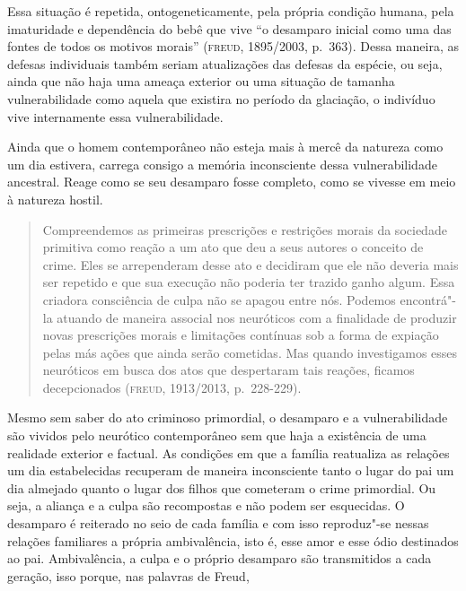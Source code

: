 Essa situação é repetida, ontogeneticamente, pela própria condição
humana, pela imaturidade e dependência do bebê que vive ``o desamparo
inicial como uma das fontes de todos os motivos morais'' (\textsc{freud},
1895/2003, p.~363). Dessa maneira, as defesas individuais também seriam
atualizações das defesas da espécie, ou seja, ainda que não haja uma
ameaça exterior ou uma situação de tamanha vulnerabilidade como aquela
que existira no período da glaciação, o indivíduo vive internamente essa
vulnerabilidade.

Ainda que o homem contemporâneo não esteja mais à mercê da natureza como
um dia estivera, carrega consigo a memória inconsciente dessa
vulnerabilidade ancestral. Reage como se seu desamparo fosse completo,
como se vivesse em meio à natureza hostil.

\begin{quote}
Compreendemos as primeiras prescrições e restrições morais da sociedade
primitiva como reação a um ato que deu a seus autores o conceito de
crime. Eles se arrependeram desse ato e decidiram que ele não deveria
mais ser repetido e que sua execução não poderia ter trazido ganho
algum. Essa criadora consciência de culpa não se apagou entre nós.
Podemos encontrá"-la atuando de maneira associal nos neuróticos com a
finalidade de produzir novas prescrições morais e limitações contínuas
sob a forma de expiação pelas más ações que ainda serão cometidas. Mas
quando investigamos esses neuróticos em busca dos atos que despertaram
tais reações, ficamos decepcionados (\textsc{freud}, 1913/2013, p.~228-229).
\end{quote}

Mesmo sem saber do ato criminoso primordial, o desamparo e a
vulnerabilidade são vividos pelo neurótico contemporâneo sem que haja a
existência de uma realidade exterior e factual. As condições em que a
família reatualiza as relações um dia estabelecidas recuperam de maneira
inconsciente tanto o lugar do pai um dia almejado quanto o lugar dos
filhos que cometeram o crime primordial. Ou seja, a aliança e a culpa
são recompostas e não podem ser esquecidas. O desamparo é reiterado no
seio de cada família e com isso reproduz"-se nessas relações familiares a
própria ambivalência, isto é, esse amor e esse ódio destinados ao pai.
Ambivalência, a culpa e o próprio desamparo são transmitidos a cada
geração, isso porque, nas palavras de Freud,


